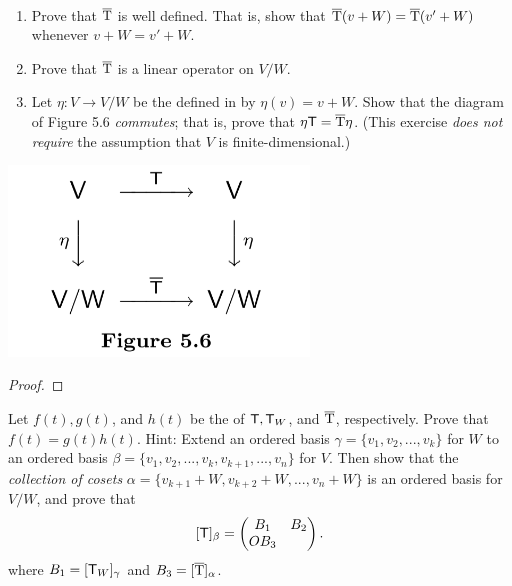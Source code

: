 \begin{exercise} \label{exercise 5.4.27} \ 

\begin{enumerate}
\item Prove that \(\mathrm{\overline{T}}\) is well defined.
That is, show that \(\mathrm{\overline{T}}(v + W) = \mathrm{\overline{T}}(v' + W)\) whenever \(v + W = v' + W\).
\item Prove that \(\mathrm{\overline{T}}\) is a linear operator on \(V/W\).
\item Let \(\eta : V \to V/W\) be the \LTRAN{} defined in  by \(\eta(v) = v + W\).
Show that the diagram of Figure 5.6 \emph{commutes}; that is, prove that \(\eta \textsf{T} = \mathrm{\overline{T}} \eta\).
(This exercise \emph{does not require} the assumption that \(V\) is finite-dimensional.)
\end{enumerate}

\includegraphics[width=8cm]{images/figure-5-6.png}

\end{exercise}

\begin{proof}
\end{proof}

\begin{exercise} \label{exercise 5.4.28}
Let \(f(t), g(t)\), and \(h(t)\) be the \CPOLY{} of \(\textsf{T}, \textsf{T}_W\), and \(\mathrm{\overline{T}}\), respectively.
Prove that \(f(t) = g(t)h(t)\).
Hint: Extend an ordered basis \(\gamma = \{ v_1, v_2, ..., v_k \}\) for \(W\) to an ordered basis \(\beta = \{ v_1, v_2, ..., v_k, v_{k + 1}, ..., v_n \}\) for \(V\).
Then show that the \emph{collection of cosets} \(\alpha = \{ v_{k + 1} + W, v_{k + 2} + W, ..., v_n + W \}\) is an ordered basis for \(V/W\), and prove that
\[
    [\textsf{T}]_{\beta} = \begin{pmatrix}
        B_1 & B_2 \\ O B_3
    \end{pmatrix}.
\]
where \(B_1 = [\textsf{T}_W]_{\gamma}\) and \(B_3 = [\mathrm{\overline{T}}]_{\alpha}\).
\end{exercise}

